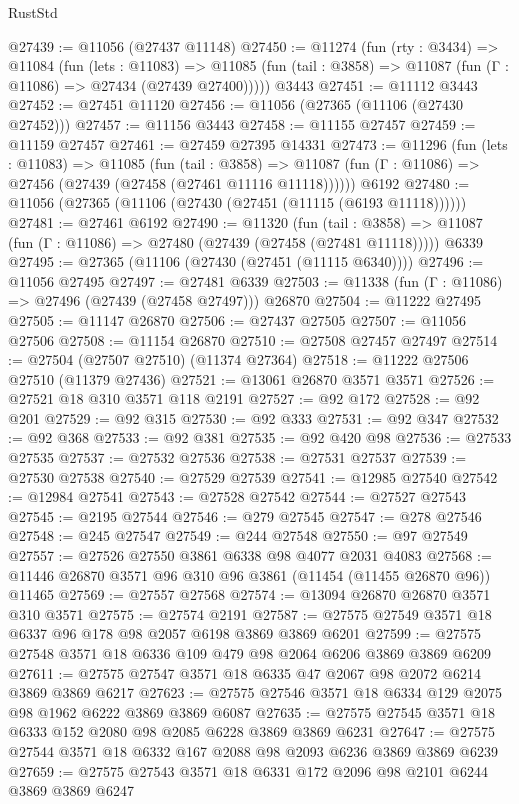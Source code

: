 \begin{lexlean}{RustStd}
\begin{coremodule}
@27439 := @11056 (@27437 @11148)
@27450 := @11274
    (fun (rty : @3434) =>
    @11084
      (fun (lets : @11083) =>
      @11085 (fun (tail : @3858) => @11087 (fun (Γ : @11086) => @27434 (@27439 @27400)))))
    @3443
@27451 := @11112 @3443
@27452 := @27451 @11120
@27456 := @11056 (@27365 (@11106 (@27430 @27452)))
@27457 := @11156 @3443
@27458 := @11155 @27457
@27459 := @11159 @27457
@27461 := @27459 @27395 @14331
@27473 := @11296
    (fun (lets : @11083) =>
    @11085
      (fun (tail : @3858) =>
      @11087 (fun (Γ : @11086) => @27456 (@27439 (@27458 (@27461 @11116 @11118))))))
    @6192
@27480 := @11056 (@27365 (@11106 (@27430 (@27451 (@11115 (@6193 @11118))))))
@27481 := @27461 @6192
@27490 := @11320
    (fun (tail : @3858) => @11087 (fun (Γ : @11086) => @27480 (@27439 (@27458 (@27481 @11118)))))
    @6339
@27495 := @27365 (@11106 (@27430 (@27451 (@11115 @6340))))
@27496 := @11056 @27495
@27497 := @27481 @6339
@27503 := @11338 (fun (Γ : @11086) => @27496 (@27439 (@27458 @27497))) @26870
@27504 := @11222 @27495
@27505 := @11147 @26870
@27506 := @27437 @27505
@27507 := @11056 @27506
@27508 := @11154 @26870
@27510 := @27508 @27457 @27497
@27514 := @27504 (@27507 @27510) (@11374 @27364)
@27518 := @11222 @27506 @27510 (@11379 @27436)
@27521 := @13061 @26870 @3571 @3571
@27526 := @27521 @18 @310 @3571 @118 @2191
@27527 := @92 @172
@27528 := @92 @201
@27529 := @92 @315
@27530 := @92 @333
@27531 := @92 @347
@27532 := @92 @368
@27533 := @92 @381
@27535 := @92 @420 @98
@27536 := @27533 @27535
@27537 := @27532 @27536
@27538 := @27531 @27537
@27539 := @27530 @27538
@27540 := @27529 @27539
@27541 := @12985 @27540
@27542 := @12984 @27541
@27543 := @27528 @27542
@27544 := @27527 @27543
@27545 := @2195 @27544
@27546 := @279 @27545
@27547 := @278 @27546
@27548 := @245 @27547
@27549 := @244 @27548
@27550 := @97 @27549
@27557 := @27526 @27550 @3861 @6338 @98 @4077 @2031 @4083
@27568 := @11446 @26870 @3571 @96 @310 @96 @3861 (@11454 (@11455 @26870 @96)) @11465
@27569 := @27557 @27568
@27574 := @13094 @26870 @26870 @3571 @310 @3571
@27575 := @27574 @2191
@27587 := @27575 @27549 @3571 @18 @6337 @96 @178 @98 @2057 @6198 @3869 @3869 @6201
@27599 := @27575 @27548 @3571 @18 @6336 @109 @479 @98 @2064 @6206 @3869 @3869 @6209
@27611 := @27575 @27547 @3571 @18 @6335 @47 @2067 @98 @2072 @6214 @3869 @3869 @6217
@27623 := @27575 @27546 @3571 @18 @6334 @129 @2075 @98 @1962 @6222 @3869 @3869 @6087
@27635 := @27575 @27545 @3571 @18 @6333 @152 @2080 @98 @2085 @6228 @3869 @3869 @6231
@27647 := @27575 @27544 @3571 @18 @6332 @167 @2088 @98 @2093 @6236 @3869 @3869 @6239
@27659 := @27575 @27543 @3571 @18 @6331 @172 @2096 @98 @2101 @6244 @3869 @3869 @6247

\end{coremodule}
\end{lexlean}
